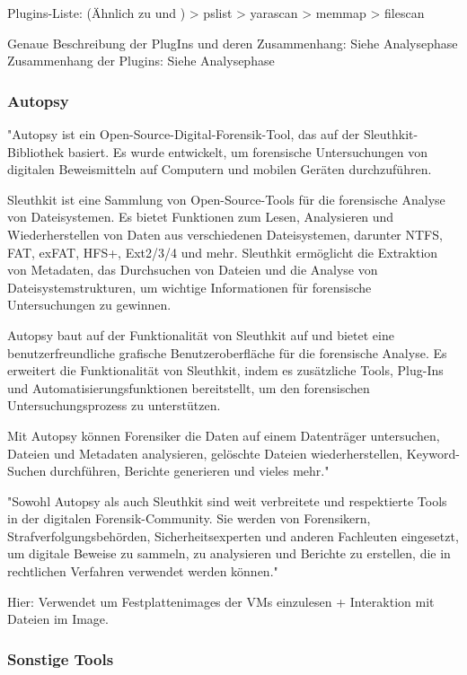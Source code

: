 	Plugins-Liste: (Ähnlich zu \cite{Hariharan} und \cite{Dayalamurthy.2013})
	  > pslist	
	  > yarascan		
	  > memmap	 	
	  > filescan
		
	Genaue Beschreibung der PlugIns und deren Zusammenhang: Siehe Analysephase		
	Zusammenhang der Plugins: Siehe Analysephase

\subsubsection*{Autopsy}
	"Autopsy ist ein Open-Source-Digital-Forensik-Tool, das auf der Sleuthkit-Bibliothek basiert. Es wurde entwickelt, um forensische Untersuchungen von digitalen Beweismitteln auf Computern und mobilen Geräten durchzuführen.

	Sleuthkit ist eine Sammlung von Open-Source-Tools für die forensische Analyse von Dateisystemen. Es bietet Funktionen zum Lesen, Analysieren und Wiederherstellen von Daten aus verschiedenen Dateisystemen, darunter NTFS, FAT, exFAT, HFS+, Ext2/3/4 und mehr. Sleuthkit ermöglicht die Extraktion von Metadaten, das Durchsuchen von Dateien und die Analyse von Dateisystemstrukturen, um wichtige Informationen für forensische Untersuchungen zu gewinnen.
	
	Autopsy baut auf der Funktionalität von Sleuthkit auf und bietet eine benutzerfreundliche grafische Benutzeroberfläche für die forensische Analyse. Es erweitert die Funktionalität von Sleuthkit, indem es zusätzliche Tools, Plug-Ins und Automatisierungsfunktionen bereitstellt, um den forensischen Untersuchungsprozess zu unterstützen.
	
	Mit Autopsy können Forensiker die Daten auf einem Datenträger untersuchen, Dateien und Metadaten analysieren, gelöschte Dateien wiederherstellen, Keyword-Suchen durchführen, Berichte generieren und vieles mehr."

	"Sowohl Autopsy als auch Sleuthkit sind weit verbreitete und respektierte Tools in der digitalen Forensik-Community. Sie werden von Forensikern, Strafverfolgungsbehörden, Sicherheitsexperten und anderen Fachleuten eingesetzt, um digitale Beweise zu sammeln, zu analysieren und Berichte zu erstellen, die in rechtlichen Verfahren verwendet werden können."
	
	Hier: Verwendet um Festplattenimages der VMs einzulesen + Interaktion mit Dateien im Image. 

\subsubsection*{Sonstige Tools}

